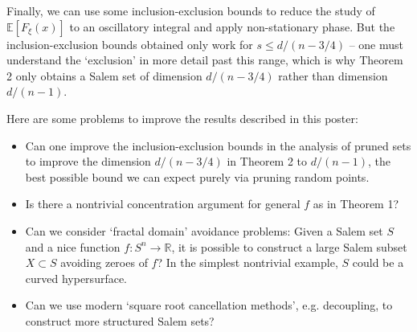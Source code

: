 \documentclass[12pt]{article}
\numberwithin{equation}{section}
\theoremstyle{plain}
\theoremstyle{remark}
\newcommand{\newpart}[1]
{\colorbox[rgb]{0.97,0.92,0.7}{\makebox[0.97\columnwidth]
{\rule[-1.2ex]{0pt}{3.7ex}\partfont{#1}}}\bigskip}
\newcommand{\partfont}[1]{{\LARGE \textsf{\textbf{#1}}}}
\begin{document}
{{\begin{multicols}{2}
{\vspace{0.1cm}

Finally, we can use some inclusion-exclusion bounds to reduce the study of $\mathbb{E}[F_\xi(x)]$ to an oscillatory integral and apply non-stationary phase. But the inclusion-exclusion bounds obtained only work for $s \leq d/(n-3/4)$ -- one must understand the `exclusion' in more detail past this range, which is why Theorem 2 only obtains a Salem set of dimension $d/(n-3/4)$ rather than dimension $d/(n-1)$.
}

\vspace{0.2cm}

\newpart{What's Next}

\large{Here are some problems to improve the results described in this poster:

\begin{itemize}
    \item Can one improve the inclusion-exclusion bounds in the analysis of pruned sets to improve the dimension $d/(n-3/4)$ in Theorem 2 to $d/(n-1)$, the best possible bound we can expect purely via pruning random points.

    \item Is there a nontrivial concentration argument for general $f$ as in Theorem 1?

    \item Can we consider `fractal domain' avoidance problems: Given a Salem set $S$ and a nice function $f: S^n \to \mathbb{R}$, it is possible to construct a large Salem subset $X \subset S$ avoiding zeroes of $f$? In the simplest nontrivial example, $S$ could be a curved hypersurface.

    \item Can we use modern `square root cancellation methods', e.g. decoupling, to construct more structured Salem sets?
\end{itemize}
%

\vspace{0.5cm}}



\end{multicols}}}
\end{document}

